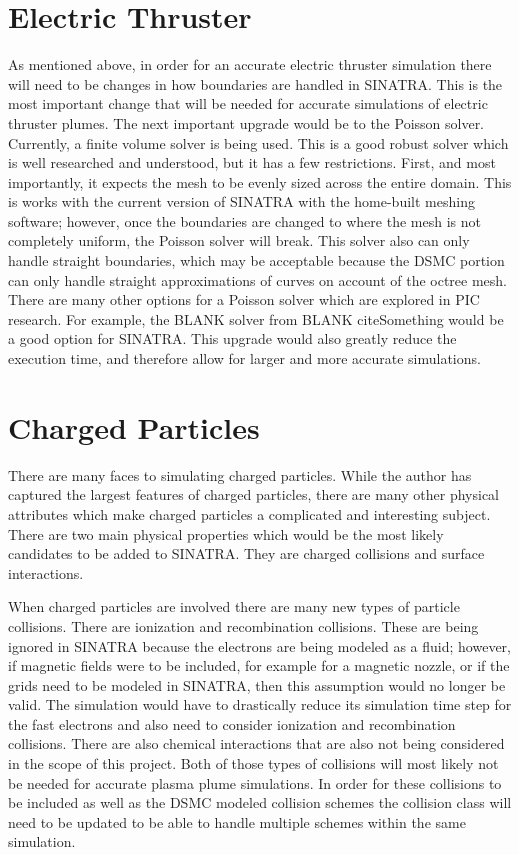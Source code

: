 \section{Electric Thruster}

As mentioned above, in order for an accurate electric thruster simulation there will need to be changes in how boundaries are handled in SINATRA. This is the most important change that will be needed for accurate simulations of electric thruster plumes. The next important upgrade would be to the Poisson solver. Currently, a finite volume solver is being used. This is a good robust solver which is well researched and understood, but it has a few restrictions. First, and most importantly, it expects the mesh to be evenly sized across the entire domain. This is works with the current version of SINATRA with the home-built meshing software; however, once the boundaries are changed to where the mesh is not completely uniform, the Poisson solver will break. This solver also can only handle straight boundaries, which may be acceptable because the DSMC portion can only handle straight approximations of curves on account of the octree mesh. There are many other options for a Poisson solver which are explored in PIC research. For example, the BLANK solver from BLANK cite{Something} would be a good option for SINATRA. This upgrade would also greatly reduce the execution time, and therefore allow for larger and more accurate simulations. \par


\section{Charged Particles}

There are many faces to simulating charged particles. While the author has captured the largest features of charged particles, there are many other physical attributes which make charged particles a complicated and interesting subject. There are two main physical properties which would be the most likely candidates to be added to SINATRA. They are charged collisions and surface interactions. \par

\indent When charged particles are involved there are many new types of particle collisions. There are ionization and recombination collisions. These are being ignored in SINATRA because the electrons are being modeled as a fluid; however, if magnetic fields were to be included, for example for a magnetic nozzle, or if the grids need to be modeled in SINATRA, then this assumption would no longer be valid. The simulation would have to drastically reduce its simulation time step for the fast electrons and also need to consider ionization and recombination collisions. There are also chemical interactions that are also not being considered in the scope of this project. Both of those types of collisions will most likely not be needed for accurate plasma plume simulations. In order for these collisions to be included as well as the DSMC modeled collision schemes the collision class will need to be updated to be able to handle multiple schemes within the same simulation. \par

